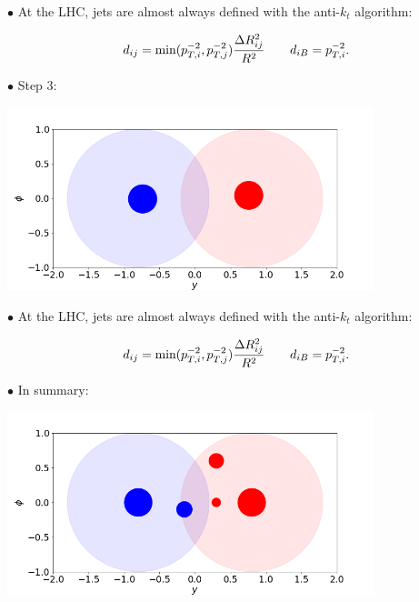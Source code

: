 \documentclass[9pt,a4paper,unknownkeysallowed,xcolor=dvipsnames,aspectratio=43]{beamer}
\begin{document}
%
%
\begin{frame}

{\color{darkred}\Large$\bullet$} {\color{darkred} At the LHC, jets are almost always defined with the anti-$k_t$ algorithm:}

  \begin{equation}
    d_{ij} = \text{min}(p_{T,i}^{-2},p_{T,j}^{-2})\frac{\Delta R_{ij}^2}{R^2}\qquad d_{iB} = p_{T,i}^{-2}.
  \notag\end{equation}
 \vspace{2mm}
  
{\color{darkred}\Large$\bullet$} Step 3:
\vspace{2mm}
\begin{center}
\includegraphics[width=0.8\textwidth]{antikt3.png}
\end{center}
\end{frame}
%
%
\begin{frame}

{\color{darkred}\Large$\bullet$} {\color{darkred} At the LHC, jets are almost always defined with the anti-$k_t$ algorithm:}

  \begin{equation}
    d_{ij} = \text{min}(p_{T,i}^{-2},p_{T,j}^{-2})\frac{\Delta R_{ij}^2}{R^2}\qquad d_{iB} = p_{T,i}^{-2}.
  \notag\end{equation}
 \vspace{2mm}
  
{\color{darkred}\Large$\bullet$} In summary:
\vspace{2mm}
\begin{center}
\includegraphics[width=0.8\textwidth]{antiktcls.png}
\end{center}
\end{frame}
\end{document}
